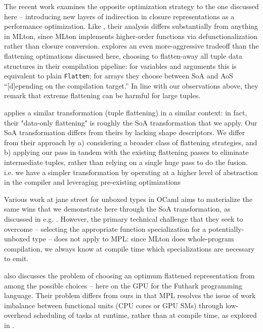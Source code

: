 \documentclass[leqno,11pt]{article}
\begin{document}
The recent work \cite{closure-sharing-paper} examines the opposite optimization strategy to the one discussed here – introducing new layers of indirection in closure representations as a performance optimization. Like \cite{manticore-arity-paper}, their analysis differs substantially from anything in MLton, since MLton implements higher-order functions via defunctionalization rather than closure conversion.
\cite{virgil-paper} explores an even more-aggressive tradeoff than the flattening optimations discussed here, choosing to flatten-away all tuple data structures in their compilation pipeline: for variables and arguments this is equivalent to plain \texttt{Flatten}; for arrays they choose between SoA and AoS ``[d]epending on the compilation target.'' In line with our observations above, they remark that extreme flattening can be harmful for large tuples.


\cite{dataonly-paper} applies a similar transformation (tuple flattening) in a similar context: in fact, their "data-only flattening" is roughly the SoA transformation that we apply. Our SoA transformation differs from theirs by lacking shape descriptors. We differ from their approach by a) considering a broader class of flattening strategies, and b) applying our pass in tandem with the existing flattening passes to eliminate intermediate tuples, rather than relying on a single huge pass to do the fusion. i.e. we have a simpler transformation by operating at a higher level of abstraction in the compiler and leveraging pre-existing optimizations

Various work at jane street for unboxed types in OCaml aims to materialize the same wins that we demonstrate here through the SoA transformation, as discussed in e.g. \cite{layout-poly-paper}. However, the primary technical challenge that they seek to overcome – selecting the appropriate function specialization for a potentially-unboxed type – does not apply to MPL: since MLton does whole-program compilation, we always know at compile time which specializations are necessary to emit.

\cite{futhark-flatten} also discusses the problem of choosing an optimum flattened representation from among the possible choices – here on the GPU for the Futhark programming language. Their problem differs from ours in that MPL resolves the issue of work imbalance between functional units (CPU cores or GPU SMs) through low-overhead scheduling of tasks at runtime, rather than at compile time, as explored in \cite{mpl-sched-paper}.
\end{document}
